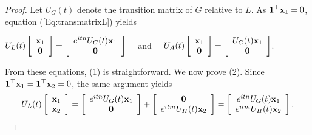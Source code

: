 \documentclass[11pt]{article}
\newcommand{\zero}{{\bf{0}}}
\newcommand{\ones}{{\bf{1}}}
\newcommand{\bx}{\mathbf x}
\begin{document}
\begin{proof}
Let $U_G(t)$ denote the transition matrix of $G$ relative to $L$. As $\ones^\top\bx_1=0$, equation (\ref{Eq:transmatrixL}) yields
\begin{center}
$U_{L}(t)\left[\begin{array}{cc} \bx_1 \\ \zero\end{array} \right]=\left[\begin{array}{cc} e^{it n}U_G(t)\bx_1 \\ \zero\end{array} \right]\quad$ and $\quad U_{A}(t)\left[\begin{array}{cc} \bx_1 \\ \zero\end{array} \right]=\left[\begin{array}{cc} U_G(t)\bx_1 \\ \zero\end{array} \right]$.
\end{center}
From these equations, (1) is straightforward. We now prove (2). Since $\ones^\top\bx_1=\ones^\top\bx_2=0$, the same argument yields \begin{equation}
\label{Eq:Ljoin}
U_{L}(t)\left[\begin{array}{cc} \bx_1 \\ \bx_2\end{array} \right]=\left[\begin{array}{cc} e^{it n}U_G(t)\bx_1 \\ \zero\end{array} \right]+\left[\begin{array}{cc} \zero \\ e^{it m}U_H(t)\bx_2\end{array} \right]=\left[\begin{array}{cc} e^{it n}U_G(t)\bx_1 \\ e^{it m}U_H(t)\bx_2\end{array} \right].
\end{equation}

\end{proof}
\end{document}
